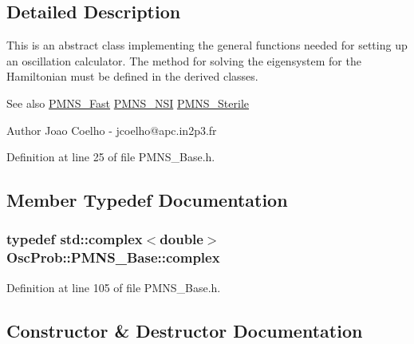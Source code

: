 \subsection{Detailed Description}
This is an abstract class implementing the general functions needed for setting up an oscillation calculator. The method for solving the eigensystem for the Hamiltonian must be defined in the derived classes.

\begin{DoxySeeAlso}{See also}
\hyperlink{classOscProb_1_1PMNS__Fast}{P\+M\+N\+S\+\_\+\+Fast} \hyperlink{classOscProb_1_1PMNS__NSI}{P\+M\+N\+S\+\_\+\+N\+SI} \hyperlink{classOscProb_1_1PMNS__Sterile}{P\+M\+N\+S\+\_\+\+Sterile}
\end{DoxySeeAlso}
\begin{DoxyAuthor}{Author}
Joao Coelho -\/ jcoelho@apc.\+in2p3.\+fr 
\end{DoxyAuthor}


Definition at line 25 of file P\+M\+N\+S\+\_\+\+Base.\+h.



\subsection{Member Typedef Documentation}
\subsubsection[{\texorpdfstring{complex}{complex}}]{\setlength{\rightskip}{0pt plus 5cm}typedef std\+::complex$<$double$>$ {\bf Osc\+Prob\+::\+P\+M\+N\+S\+\_\+\+Base\+::complex}}\hypertarget{classOscProb_1_1PMNS__Base_ae86ec4718808ce9d02e5f5b4226714ab}{}\label{classOscProb_1_1PMNS__Base_ae86ec4718808ce9d02e5f5b4226714ab}


Definition at line 105 of file P\+M\+N\+S\+\_\+\+Base.\+h.



\subsection{Constructor \& Destructor Documentation}
